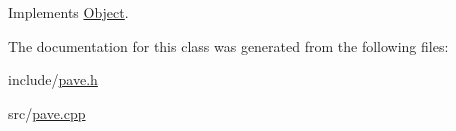 Implements \hyperlink{classObject_a262654508b0a6a8cd277911161c71024}{Object}.



The documentation for this class was generated from the following files\+:\begin{DoxyCompactItemize}
\item 
include/\hyperlink{pave_8h}{pave.\+h}\item 
src/\hyperlink{pave_8cpp}{pave.\+cpp}\end{DoxyCompactItemize}
